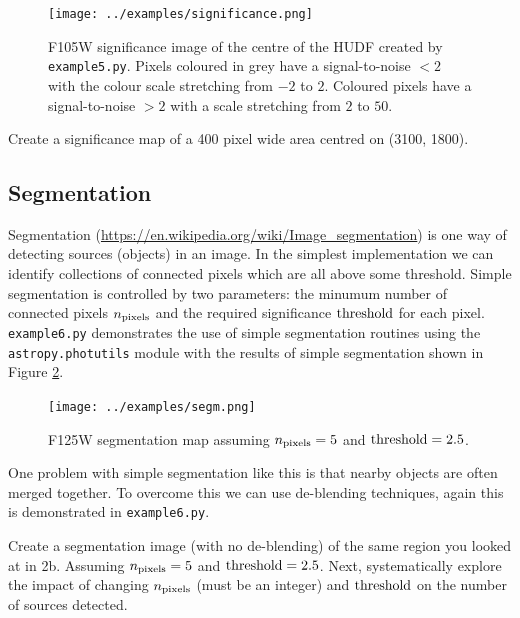 \documentclass{article}
\begin{document}
\begin{figure}\label{fig:significance}
	\centering
	\texttt{[image: ../examples/significance.png]}
	\caption{F105W significance image of the centre of the HUDF created by \texttt{example5.py}. Pixels coloured in grey have a signal-to-noise $<2$ with the colour scale stretching from $-2$ to $2$. Coloured pixels have a signal-to-noise $>2$ with a scale stretching from $2$ to $50$.}
\end{figure}


\begin{question}
Create a significance map of a 400 pixel wide area centred on (3100, 1800).
\end{question}


\subsection{Segmentation}

Segmentation (\url{https://en.wikipedia.org/wiki/Image_segmentation}) is one way of detecting sources (objects) in an image. In the simplest implementation we can identify collections of connected pixels which are all above some threshold. Simple segmentation is controlled by two parameters: the minumum number of connected pixels $n_{\rm pixels}$ and the required significance ${\rm threshold}$ for each pixel. \texttt{example6.py} demonstrates the use of simple segmentation routines using the \texttt{astropy.photutils} module with the results of simple segmentation shown in Figure \ref{fig:segm}.

\begin{figure}\label{fig:segm}
	\centering
	\texttt{[image: ../examples/segm.png]}
	\caption{F125W segmentation map assuming $n_{\rm pixels} = 5$ and ${\rm threshold} = 2.5$.}
\end{figure}

One problem with simple segmentation like this is that nearby objects are often merged together. To overcome this we can use de-blending techniques, again this is demonstrated in \texttt{example6.py}.

\begin{question}
Create a segmentation image (with no de-blending) of the same region you looked at in 2b. Assuming $n_{\rm pixels} = 5$ and ${\rm threshold} = 2.5$. Next, systematically explore the impact of changing $n_{\rm pixels}$ (must be an integer) and ${\rm threshold}$ on the number of sources detected.
\end{question}
\end{document}
